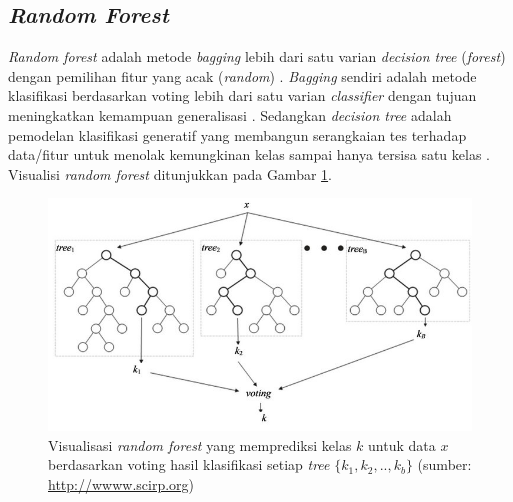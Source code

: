 \subsection{\textit{Random Forest}}

\textit{Random forest} adalah metode \textit{bagging} lebih dari satu varian \textit{decision tree} (\textit{forest}) dengan pemilihan fitur yang acak (\textit{random}) \citep{breiman2001random}. \textit{Bagging} sendiri adalah metode klasifikasi berdasarkan voting lebih dari satu varian \textit{classifier} dengan tujuan meningkatkan kemampuan generalisasi \citep{breiman1996bagging}. Sedangkan \textit{decision tree} adalah pemodelan klasifikasi generatif yang membangun serangkaian tes terhadap data/fitur untuk menolak kemungkinan kelas sampai hanya tersisa satu kelas \citep{theodoridis2015machine}. Visualisi \textit{random forest} ditunjukkan pada Gambar \ref{fig:random-forest}.

\begin{figure}
\centering
\includegraphics[scale=0.5]{../images/random-forest.png}
\caption{Visualisasi \textit{random forest} yang memprediksi kelas $k$ untuk data $x$ berdasarkan voting hasil klasifikasi setiap \textit{tree} $\{k_1, k_2, .., k_b\}$ (sumber: \url{http://wwww.scirp.org})}
\label{fig:random-forest}
\end{figure}
